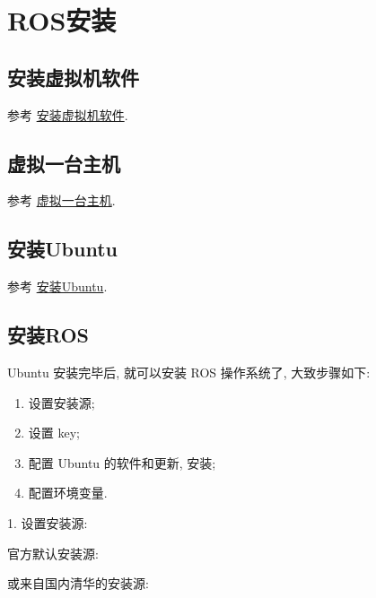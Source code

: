 \documentclass[openany, fontset=windowsold]{ctexbook}
\theoremstyle{kaiti}
\theoremstyle{normal}
\begin{document}
\section{ROS安装}

\subsection{安装虚拟机软件}

参考 \href{http://www.autolabor.com.cn/book/ROSTutorials/chapter1/12-roskai-fa-gong-ju-an-zhuang/121-an-zhuang-xu-ni-ji-ruan-jian.html}{安装虚拟机软件}.

\subsection{虚拟一台主机}

参考 \href{http://www.autolabor.com.cn/book/ROSTutorials/chapter1/12-roskai-fa-gong-ju-an-zhuang/122-xu-ni-yi-tai-zhu-ji.html}{虚拟一台主机}.

\subsection{安装Ubuntu}

参考 \href{http://www.autolabor.com.cn/book/ROSTutorials/chapter1/12-roskai-fa-gong-ju-an-zhuang/123-an-zhuang-ubuntu.html}{安装Ubuntu}.

\subsection{安装ROS}

Ubuntu 安装完毕后, 就可以安装 ROS 操作系统了, 大致步骤如下:

\begin{enumerate}
  \item 设置安装源;
  \item 设置 key;
  \item 配置 Ubuntu 的软件和更新, 安装;
  \item 配置环境变量.
\end{enumerate}

1. 设置安装源:

官方默认安装源:


或来自国内清华的安装源:
\end{document}
